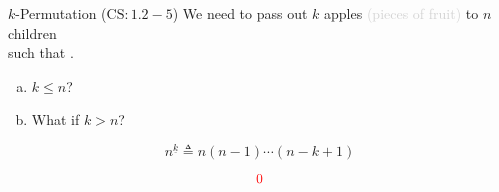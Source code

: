 
\begin{frame}{}
\end{frame}

\begin{frame}{}
  \begin{exampleblock}{$k$-Permutation ($\text{CS}: 1.2-5$)}
    We need to pass out $k$  apples \textcolor{lightgray}{(pieces of fruit)} to $n$ children \\
    such that .

    \begin{enumerate}[(a)]
      \item $k \le n$?
      \item What if $k > n$?
    \end{enumerate}
  \end{exampleblock}

  \pause
  \[
    n^{\underline{k}} \triangleq n (n-1) \cdots (n-k+1)
  \]

  \pause
  \[
    \textcolor{red}{0}
  \]
\end{frame}

